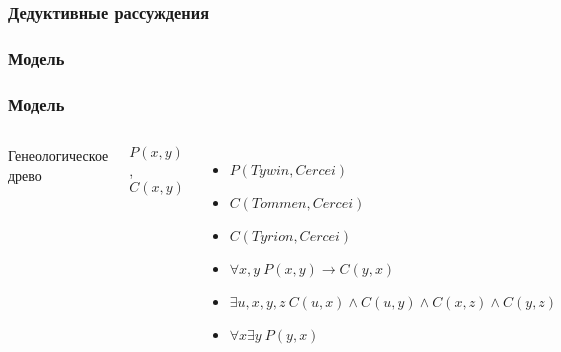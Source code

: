 \documentclass[24pt,pdf,hyperref={unicode}]{beamer}
\begin{document}
\begin{frame}\frametitle{Дедуктивные рассуждения}
\end{frame}

\begin{frame}\frametitle{Модель}
\end{frame}

\usetikzlibrary{trees}

\begin{frame}\frametitle{Модель}
\begin{columns}
Генеологическое древо


$P(x,y)$, $C(x,y)$\\[1cm]

\begin{itemize}
\item<+-> $P(Tywin,Cercei)$

\item<+-> $C(Tommen,Cercei)$

\item<+-> $C(Tyrion,Cercei)$

\item<+-> $\forall x,y\ P(x,y)\rightarrow C(y,x)$

\item<+-> $\exists u,x,y,z\ C(u,x)\wedge C(u,y)\wedge C(x,z)\wedge C(y,z)$

\item<+-> $\forall x \exists y\ P(y,x)$
\end{itemize}
\end{columns}
\end{frame}
\end{document}
